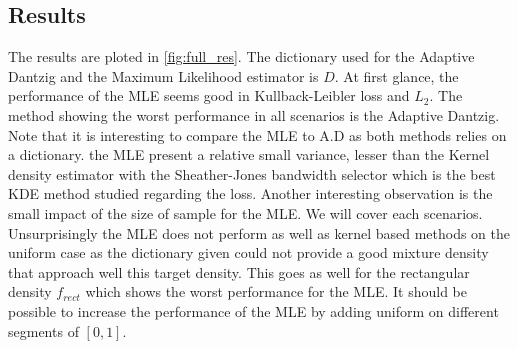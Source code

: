 \subsection{Results}
The results are ploted in \cref{fig:full_res}. The dictionary used for the Adaptive Dantzig and the Maximum Likelihood estimator is $D$. At first glance, the performance of the MLE seems good in Kullback-Leibler loss and $L_2$. The method showing the worst performance in all scenarios is the Adaptive Dantzig. Note that it is interesting to compare the MLE to A.D as both methods relies on a dictionary. the MLE present a relative small variance, lesser than the Kernel density estimator with the Sheather-Jones bandwidth selector which is the best KDE method studied regarding the loss. Another interesting observation is the small impact of the size of sample for the MLE. We will cover each scenarios. Unsurprisingly the MLE does not perform as well as kernel based methods on the uniform case as the dictionary given could not provide a good mixture density that approach well this target density. This goes as well for the rectangular density $f_{rect}$ which shows the worst performance for the MLE. It should be possible to increase the performance of the MLE by adding uniform on different segments of $[0,1]$.
